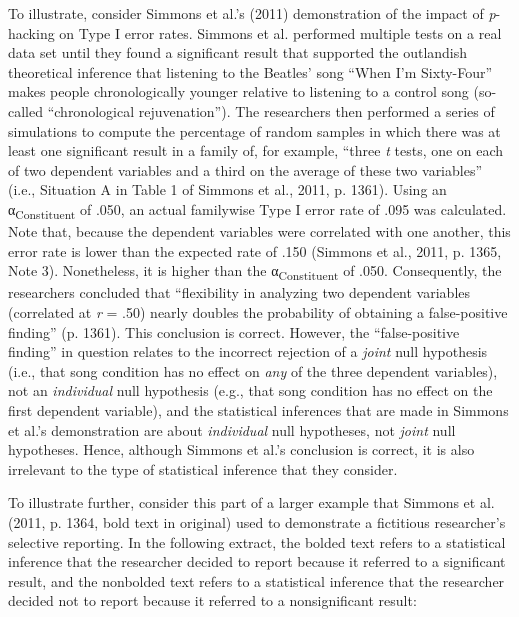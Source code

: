 \documentclass[authordate, meta]{jote-new-article}
\begin{document}
	To illustrate, consider Simmons et al.'s (2011) demonstration of the impact of \emph{p}-hacking on Type I error rates. Simmons et al. performed multiple tests on a real data set until they found a significant result that supported the outlandish theoretical inference that listening to the Beatles' song “When I'm Sixty-Four” makes people chronologically younger relative to listening to a control song (so-called “chronological rejuvenation”). The researchers then performed a series of simulations to compute the percentage of random samples in which there was at least one significant result in a family of, for example, “three \emph{t }tests, one on each of two dependent variables and a third on the average of these two variables” (i.e., Situation A in Table 1 of Simmons et al., 2011, p. 1361). Using an α\textsubscript{Constituent} of .050, an actual familywise Type I error rate of .095 was calculated. Note that, because the dependent variables were correlated with one another, this error rate is lower than the expected rate of .150 (Simmons et al., 2011, p. 1365, Note 3). Nonetheless, it is higher than the α\textsubscript{Constituent} of .050. Consequently, the researchers concluded that “flexibility in analyzing two dependent variables (correlated at \emph{r} = .50) nearly doubles the probability of obtaining a false-positive finding” (p. 1361). This conclusion is correct. However, the “false-positive finding” in question relates to the incorrect rejection of a \emph{joint} null hypothesis (i.e., that song condition has no effect on \emph{any} of the three dependent variables), not an \emph{individual} null hypothesis (e.g., that song condition has no effect on the first dependent variable), and the statistical inferences that are made in Simmons et al.'s demonstration are about \emph{individual} null hypotheses, not \emph{joint} null hypotheses. Hence, although Simmons et al.'s conclusion is correct, it is also irrelevant to the type of statistical inference that they consider.



	To illustrate further, consider this part of a larger example that Simmons et al. (2011, p. 1364, bold text in original) used to demonstrate a fictitious researcher's selective reporting. In the following extract, the bolded text refers to a statistical inference that the researcher decided to report because it referred to a significant result, and the nonbolded text refers to a statistical inference that the researcher decided not to report because it referred to a nonsignificant result:
\end{document}
